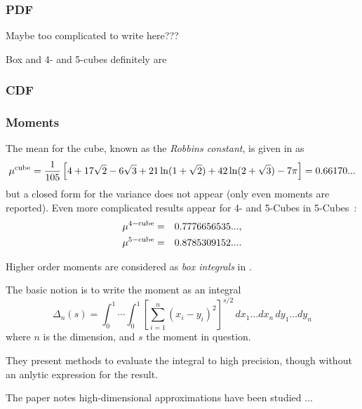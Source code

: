 \subsubsection{PDF}

Maybe too complicated to write here???

Box and 4- and 5-cubes definitely are


\subsubsection{CDF}


\subsubsection{Moments}

The mean for the cube, known as the {\em Robbins constant}, is given
in \cite{robbins78:_constant,weisstein:_cube_line_picking,Bailey2007196} as
\begin{equation}
   \label{eq:cube_mean}
 \mu^{\rm cube} = \frac{1}{105} \left[ 
                             4 + 17 \sqrt{2}- 6 \sqrt{3}  +
                             21 \ln(1+\sqrt{2}) + 
                             42 \ln(2+\sqrt{3}) - 7 \pi
                      \right]
	=	0.66170...
\end{equation}
but a closed form for the variance does not appear (only even moments
are reported). Even more complicated results appear for 4- and 5-Cubes in
5-Cubes~\cite{philip:_probab_distr_distan_between_two_4d,Bailey2007196}:
\begin{eqnarray}
 \mu^{\rm 4-cube} & = & 0.7776656535 ...    \label{eq:4-cube}, \\
 \mu^{\rm 5-cube} & = & 0.8785309152 ...     \label{eq:5-cube}.
\end{eqnarray}

Higher order moments are considered as {\em box integrals} in
\cite{Bailey2007196}. 

The basic notion is to write the moment as an integral
\begin{equation}
  \label{eq:moment_n_cube}
  \Delta_n(s) = \int_0^1 \cdots \int_0^1
        \left[ \sum_{i=1}^n (x_i - y_i)^2 \right]^{s/2}
        \, dx_1 \ldots  dx_n   \, dy_1 \ldots  dy_n  
\end{equation}
where $n$ is the dimension, and $s$ the moment in question.

They present methods to evaluate the integral to high precision,
though without an anlytic expression for the result.




The paper notes high-dimensional approximations have been studied ...

